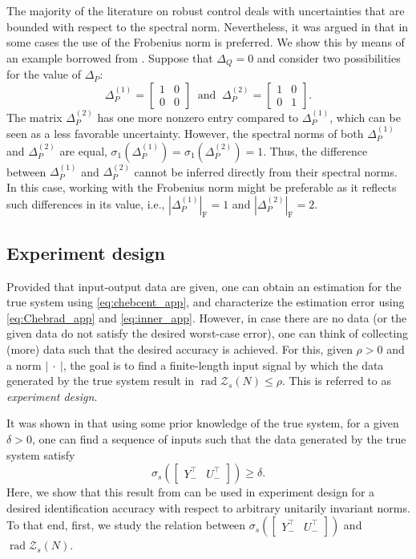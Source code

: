 \documentclass[pdflatex,sn-mathphys-num]{sn-jnl}%
\DeclareMathOperator{\rad}{rad}
\newcommand{\norm}[1]{\left|#1\right|}
\theoremstyle{thmstyleone}
\begin{document}
The majority of the literature on robust control deals with uncertainties that are bounded with respect to the spectral norm. Nevertheless, it was argued in \cite{lee1996quadratic} that in some cases the use of the Frobenius norm is preferred. We show this by means of an example borrowed from \cite{lee1996quadratic}. Suppose that $\Delta_Q=0$ and consider two possibilities for the value of $\Delta_P$:
\begin{equation}
\Delta_P^{(1)}=\begin{bmatrix}
1 & 0 \\
0 & 0
\end{bmatrix}\ \text{ and }\ \Delta_P^{(2)}=\begin{bmatrix}
1 & 0 \\
0 & 1
\end{bmatrix}.
\end{equation}
The matrix $\Delta_P^{(2)}$ has one more nonzero entry compared to $\Delta_P^{(1)}$, which can be seen as a less favorable uncertainty. However, the spectral norms of both $\Delta_P^{(1)}$ and $\Delta_P^{(2)}$ are equal, $\sigma_1(\Delta_P^{(1)})=\sigma_1(\Delta_P^{(2)})=1$. Thus, the difference between $\Delta_P^{(1)}$ and $\Delta_P^{(2)}$ cannot be inferred directly from their spectral norms. In this case, working with the Frobenius norm might be preferable as it reflects such differences in its value, i.e., $|\Delta_P^{(1)}|_\text{F}=1$ and $|\Delta_P^{(2)}|_\text{F}=2$. 

\subsection{Experiment design}

Provided that input-output data are given, one can obtain an estimation for the true system using \eqref{eq:chebcent_app}, and characterize the estimation error using \eqref{eq:Chebrad_app} and  \eqref{eq:inner_app}. However, in case there are no data (or the given data do not satisfy the desired worst-case error), one can think of collecting (more) data such that the desired accuracy is achieved. For this, given $\rho>0$ and a norm $\norm{\ \cdot\ }$, the goal is to find a finite-length input signal by which the data generated by the true system result in $\rad\mathcal{Z}_s(N) \leq \rho$. This is referred to as \emph{experiment design}. 

It was shown in \cite{coulson2022quantitative} that using some prior knowledge of the true system, for a given $\delta>0$, one can find a sequence of inputs such that the data generated by the true system satisfy
\begin{equation}
\sigma_{s}\left(\begin{bmatrix}
Y_-^\top & U_-^\top
\end{bmatrix}\right)\geq \delta.
\end{equation}
Here, we show that this result from \cite{coulson2022quantitative} can be used in experiment design for a desired identification accuracy with respect to arbitrary unitarily invariant norms. To that end, first, we study the relation between $\sigma_{s}\left(\begin{bmatrix}
Y_-^\top & U_-^\top
\end{bmatrix}\right)$ and $\rad\mathcal{Z}_s(N)$. 
\end{document}

